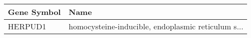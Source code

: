 \begin{tabular}{ll}
\toprule
Gene Symbol &                                               Name \\
\midrule
    HERPUD1 & homocysteine-inducible, endoplasmic reticulum s... \\
\bottomrule
\end{tabular}
